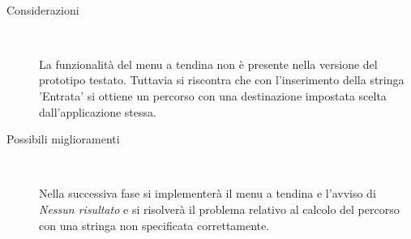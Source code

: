 \documentclass[../../SperimentazioniPratiche.tex]{subfiles}
\begin{document}
\begin{tcolorbox}[fonttitle=\bfseries, 
								adjusted title={\Large Prova 11A.1}, 
								breakable, 
								sharp corners=south,
								colback=white, 
								colframe=white!60!black]
\begin{description}[leftmargin=0.7cm,labelwidth=!]
        			\tcbline
        			
        			\item[Analisi risultati] \ \par
        				\begin{description}
        					\item[Considerazioni] \ \par
        						La funzionalità del menu a tendina non è presente nella versione del prototipo testato. Tuttavia si riscontra che con l'inserimento della stringa 'Entrata' si ottiene un percorso con una destinazione impostata scelta dall'applicazione stessa.
        					
        					\item[Possibili miglioramenti] \ \par 
        						Nella successiva fase si implementerà il menu a tendina e l'avviso di \textit{Nessun risultato} e si risolverà il problema relativo al calcolo del percorso con una stringa non specificata correttamente.
        				\end{description}
        				
				\end{description}  
				
			\end{tcolorbox}



	
	\newpage		
\end{document}
